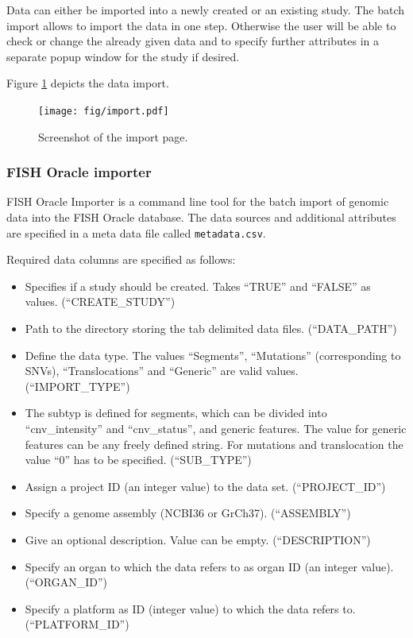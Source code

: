\documentclass[11pt,final]{article}
\begin{document}
Data can either be imported into a newly created or an existing study. 
The batch import allows to import the data in one step. Otherwise the
user will be able to check or change the already given data and to
specify further attributes in a separate popup window for the study
if desired.

Figure \ref{fig:import} depicts the data import.

\begin{figure}[h]
	\begin{center}
	  \texttt{[image: fig/import.pdf]}
	\end{center}
	\caption{Screenshot of the import page.}
	\label{fig:import}
\end{figure}

\subsubsection{FISH Oracle importer}

FISH Oracle Importer is a command line tool for the batch import of genomic
data into the FISH Oracle database. The data sources and additional attributes
are specified in a meta data file called \texttt{metadata.csv}. 

Required data columns are specified as follows:

\begin{itemize}
  \item Specifies if a study should be created. Takes ``TRUE'' and ``FALSE'' as
    values. (``{CREATE\_STUDY}'')
  \item Path to the directory storing the tab delimited data files.
        (``DATA\_PATH'')
  \item Define the data type. The values ``Segments'', ``Mutations''
        (corresponding to SNVs), ``Translocations'' and ``Generic'' are valid 
	values. (``IMPORT\_TYPE'')
  \item The subtyp is defined for segments, which can be divided into
        ``cnv\_intensity'' and ``cnv\_status'', and generic features. The value
	for generic features can be any freely defined string. For mutations and
	translocation the value ``0'' has to be specified. (``SUB\_TYPE'')
  \item Assign a project ID (an integer value) to the data set.
        (``PROJECT\_ID'')
  \item Specify a genome assembly (NCBI36 or GrCh37). (``ASSEMBLY'')
  \item Give an optional description. Value can be empty. (``DESCRIPTION'')
  \item Specify an organ to which the data refers to as organ ID (an integer
        value). (``ORGAN\_ID'')
  \item Specify a platform as ID (integer value) to which the data refers to.
        (``PLATFORM\_ID'')
\end{itemize}
\end{document}
